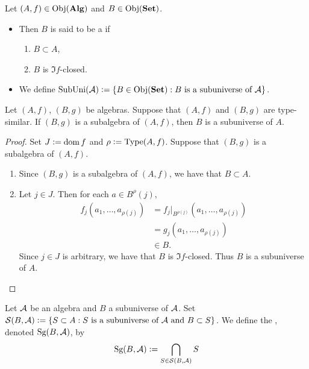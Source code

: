 \documentclass{book}
\begin{document}
	\begin{defn}
		Let $(A, f) \in \operatorname{Obj}(\operatorname*{\text{\textbf{Alg}}})$ and $B \in \operatorname{Obj}(\operatorname*{\text{\textbf{Set}}})$. 
		\begin{itemize}
			\item Then $B$ is said to be a  if 
			\begin{enumerate}
				\item $B \subset A$,
				\item $B$ is $\Im f$-closed.
			\end{enumerate}
			\item We define $\operatorname{SubUni}(\mathcal{A}) \vcentcolon= \{B \in \operatorname{Obj}(\operatorname*{\text{\textbf{Set}}}): \text{$B$ is a subuniverse of $\mathcal{A}$}\}$.
		\end{itemize}
	\end{defn}
	
	\begin{ex}
		Let $(A, f)$, $(B, g)$ be algebras. Suppose that $(A, f)$ and $(B, g)$ are type-similar. If $(B, g)$ is a subalgebra of $(A, f)$, then $B$ is a subuniverse of $A$. 
	\end{ex}
	
	\begin{proof}
		Set $J \vcentcolon= \operatorname{dom} f$ and $\rho \vcentcolon= \operatorname{Type}(A, f)$. Suppose that $(B, g)$ is a subalgebra of $(A, f)$. 
		\begin{enumerate}
			\item Since $(B, g)$ is a subalgebra of $(A, f)$, we have that $B \subset A$.
			\item Let $j \in J$. Then for each $a \in B^\rho(j)$, 
			\begin{align*}
				f_j(a_1, \ldots, a_{\rho(j)})
				& = f_j|_{B^{\rho(j)}}(a_1, \ldots, a_{\rho(j)}) \\
				& = g_j(a_1, \ldots, a_{\rho(j)}) \\
				& \in B.
			\end{align*}
			Since $j \in J$ is arbitrary, we have that $B$ is $\Im f$-closed. Thus $B$ is a subuniverse of $A$.
		\end{enumerate}
	\end{proof}

	\begin{defn}
		Let $\mathcal{A}$ be an algebra and $B$ a subuniverse of $\mathcal{A}$. Set $\mathcal{S}(B, \mathcal{A}) \vcentcolon= \{S \subset A: \text{$S$ is a subuniverse of $\mathcal{A}$ and $B \subset S$}\}$. We define the , denoted $\operatorname*{\text{Sg}}(B, \mathcal{A})$, by
		$$\operatorname*{\text{Sg}}(B, \mathcal{A}) \vcentcolon= \bigcap\limits_{S \in \mathcal{S}(B, \mathcal{A})} S $$
	\end{defn}
\end{document}
